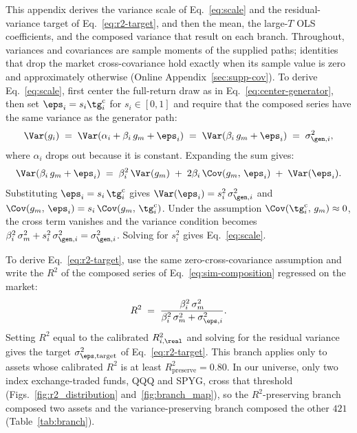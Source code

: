 This appendix derives the variance scale of Eq.~\eqref{eq:scale} and
the residual-variance target of Eq.~\eqref{eq:r2-target}, and then the
mean, the large-$T$ OLS coefficients, and the composed variance that
result on each branch. Throughout, variances and covariances are
sample moments of the supplied paths; identities that drop the market
cross-covariance hold exactly when its sample value is zero and
approximately otherwise (Online Appendix~\ref{sec:supp-cov}). To
derive Eq.~\eqref{eq:scale}, first center the full-return
draw as in Eq.~\eqref{eq:center-generator}, then set
$\eps_i=s_i\tg_i^{\mathrm c}$ for $s_i\in[0,1]$ and require
that the composed series have the same variance as the generator
path:
\begin{equation}
  \Var(g_i) \;=\; \Var(\alpha_i + \beta_i\, g_m + \eps_i)
            \;=\; \Var(\beta_i\, g_m + \eps_i)
            \;=\; \sigma_{\gen,i}^2,
\end{equation}
where $\alpha_i$ drops out because it is constant. Expanding the sum
gives:
\begin{equation}
  \Var(\beta_i\, g_m + \eps_i) \;=\; \beta_i^2\, \Var(g_m)
  \;+\; 2 \beta_i\, \Cov(g_m,\, \eps_i)
  \;+\; \Var(\eps_i).
\end{equation}
Substituting $\eps_i = s_i\,\tg_i^{\mathrm c}$ gives
$\Var(\eps_i) = s_i^2\,\sigma_{\gen,i}^2$ and
$\Cov(g_m,\, \eps_i) = s_i\,\Cov(g_m,\, \tg_i^{\mathrm c})$. Under the
assumption $\Cov(\tg_i^{\mathrm c},\,g_m)\approx0$, the cross term vanishes and
the variance condition becomes
$\beta_i^2\, \sigma_m^2 + s_i^2\, \sigma_{\gen,i}^2 =
\sigma_{\gen,i}^2$. Solving for $s_i^2$ gives Eq.~\eqref{eq:scale}.

To derive Eq.~\eqref{eq:r2-target}, use the same zero-cross-covariance
assumption and write the $R^2$ of the composed series of
Eq.~\eqref{eq:sim-composition} regressed on the market:
\begin{equation}
  R^2 \;=\; \frac{\beta_i^2\, \sigma_m^2}{\beta_i^2\, \sigma_m^2 + \sigma_{\eps,i}^2}.
\end{equation}
Setting $R^2$ equal to the calibrated $R^2_{i,\real}$ and solving for
the residual variance gives the target $\sigma_{\eps,\mathrm{target}}^2$
of Eq.~\eqref{eq:r2-target}. This branch applies only to assets whose
calibrated $R^2$ is at least $R^2_{\mathrm{preserve}} = 0.80$. In our
universe, only two index exchange-traded funds, QQQ and SPYG, cross
that threshold (Figs.~\ref{fig:r2_distribution}
and~\ref{fig:branch_map}), so the $R^2$-preserving branch composed two
assets and the variance-preserving branch composed the other $421$
(Table~\ref{tab:branch}).

